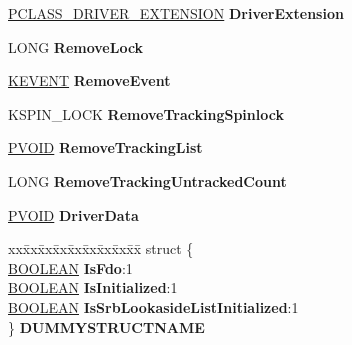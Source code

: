 \begin{DoxyCompactItemize}
\item 
\mbox{\label{struct___c_o_m_m_o_n___d_e_v_i_c_e___e_x_t_e_n_s_i_o_n_a66261685487b44aafd808da83260b70c}} 
\hyperlink{struct___c_l_a_s_s___d_r_i_v_e_r___e_x_t_e_n_s_i_o_n}{P\+C\+L\+A\+S\+S\+\_\+\+D\+R\+I\+V\+E\+R\+\_\+\+E\+X\+T\+E\+N\+S\+I\+ON} {\bfseries Driver\+Extension}
\item 
\mbox{\label{struct___c_o_m_m_o_n___d_e_v_i_c_e___e_x_t_e_n_s_i_o_n_ac50b855c4394e1a74a623d66936180d8}} 
L\+O\+NG {\bfseries Remove\+Lock}
\item 
\mbox{\label{struct___c_o_m_m_o_n___d_e_v_i_c_e___e_x_t_e_n_s_i_o_n_a0dfaedd8953c9af339c6e576663dbe70}} 
\hyperlink{struct___k_e_v_e_n_t}{K\+E\+V\+E\+NT} {\bfseries Remove\+Event}
\item 
\mbox{\label{struct___c_o_m_m_o_n___d_e_v_i_c_e___e_x_t_e_n_s_i_o_n_a459369b3c1fa9893d0e651c77a97a31b}} 
K\+S\+P\+I\+N\+\_\+\+L\+O\+CK {\bfseries Remove\+Tracking\+Spinlock}
\item 
\mbox{\label{struct___c_o_m_m_o_n___d_e_v_i_c_e___e_x_t_e_n_s_i_o_n_a0289225d0413b374f815e84d419294ed}} 
\hyperlink{interfacevoid}{P\+V\+O\+ID} {\bfseries Remove\+Tracking\+List}
\item 
\mbox{\label{struct___c_o_m_m_o_n___d_e_v_i_c_e___e_x_t_e_n_s_i_o_n_ad592ac728e7f85e83dd330507df1a0c2}} 
L\+O\+NG {\bfseries Remove\+Tracking\+Untracked\+Count}
\item 
\mbox{\label{struct___c_o_m_m_o_n___d_e_v_i_c_e___e_x_t_e_n_s_i_o_n_aca9c48fa571c4beaf104ce36e1e1da47}} 
\hyperlink{interfacevoid}{P\+V\+O\+ID} {\bfseries Driver\+Data}
\item 
\mbox{\label{struct___c_o_m_m_o_n___d_e_v_i_c_e___e_x_t_e_n_s_i_o_n_a303ef32b1e1816d40d590c5eb5a41abb}} 
\begin{tabbing}
xx\=xx\=xx\=xx\=xx\=xx\=xx\=xx\=xx\=\kill
struct \{\\
\>\hyperlink{_processor_bind_8h_a112e3146cb38b6ee95e64d85842e380a}{BOOLEAN} {\bfseries IsFdo}:1\\
\>\hyperlink{_processor_bind_8h_a112e3146cb38b6ee95e64d85842e380a}{BOOLEAN} {\bfseries IsInitialized}:1\\
\>\hyperlink{_processor_bind_8h_a112e3146cb38b6ee95e64d85842e380a}{BOOLEAN} {\bfseries IsSrbLookasideListInitialized}:1\\
\} {\bfseries DUMMYSTRUCTNAME}\\


\end{tabbing}
\end{DoxyCompactItemize}
